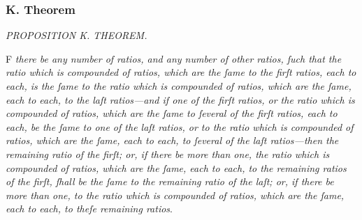 \documentclass[11pt,preview]{standalone}
\begin{document}
\subsubsection{K. Theorem}

\newcommand{\bluea}{{\color{cblue}{\textit{a}}}}
\newcommand{\blueb}{{\color{cblue}{\textit{b}}}}
\newcommand{\bluec}{{\color{cblue}{\textit{c}}}}
\newcommand{\blued}{{\color{cblue}{\textit{d}}}}
\newcommand{\bluee}{{\color{cblue}{\textit{e}}}}
\newcommand{\bluef}{{\color{cblue}{\textit{f}}}}
\newcommand{\blueg}{{\color{cblue}{\textit{g}}}}

\newcommand{\redA}{{\color{cred}{A}}}
\newcommand{\redB}{{\color{cred}{B}}}
\newcommand{\redC}{{\color{cred}{C}}}
\newcommand{\redD}{{\color{cred}{D}}}
\newcommand{\redE}{{\color{cred}{E}}}
\newcommand{\redF}{{\color{cred}{F}}}
\newcommand{\redG}{{\color{cred}{G}}}
\newcommand{\redH}{{\color{cred}{H}}}
\newcommand{\redK}{{\color{cred}{K}}}
\newcommand{\redL}{{\color{cred}{L}}}
\newcommand{\redM}{{\color{cred}{M}}}
\newcommand{\redN}{{\color{cred}{N}}}

\newcommand{\yellowO}{{\color{cyellow}{O}}}
\newcommand{\yellowP}{{\color{cyellow}{P}}}
\newcommand{\yellowQ}{{\color{cyellow}{Q}}}
\newcommand{\yellowR}{{\color{cyellow}{R}}}
\newcommand{\yellowS}{{\color{cyellow}{S}}}
\newcommand{\yellowT}{{\color{cyellow}{T}}}
\newcommand{\yellowV}{{\color{cyellow}{V}}}
\newcommand{\yellowW}{{\color{cyellow}{W}}}
\newcommand{\yellowX}{{\color{cyellow}{X}}}
\newcommand{\yellowY}{{\color{cyellow}{Y}}}

\begin{minipage}{\textwidth}
    \begin{center}
        \textit{PROPOSITION K. THEOREM.}\label{book5prK} \\
    \end{center}

    \begin{center}
        \raggedright \lettrine[lines=3, loversize=1, nindent=0pt]{}{}F \textit{there be any number of ratios, and any number of other ratios, ſuch that the ratio which is compounded of ratios, which are the ſame to the firſt ratios, each to each, is the ſame to the ratio which is compounded of ratios, which are the ſame, each to each, to the laſt ratios—and if one of the firſt ratios, or the ratio which is compounded of ratios, which are the ſame to ſeveral of the firſt ratios, each to each, be the ſame to one of the laſt ratios, or to the ratio which is compounded of ratios, which are the ſame, each to each, to ſeveral of the laſt ratios—then the remaining ratio of the firſt; or, if there be more than one, the ratio which is compounded of ratios, which are the ſame, each to each, to the remaining ratios of the firſt, ſhall be the ſame to the remaining ratio of the laſt; or, if there be more than one, to the ratio which is compounded of ratios, which are the ſame, each to each, to theſe remaining ratios}.
    \end{center}
\end{minipage}
\end{document}
